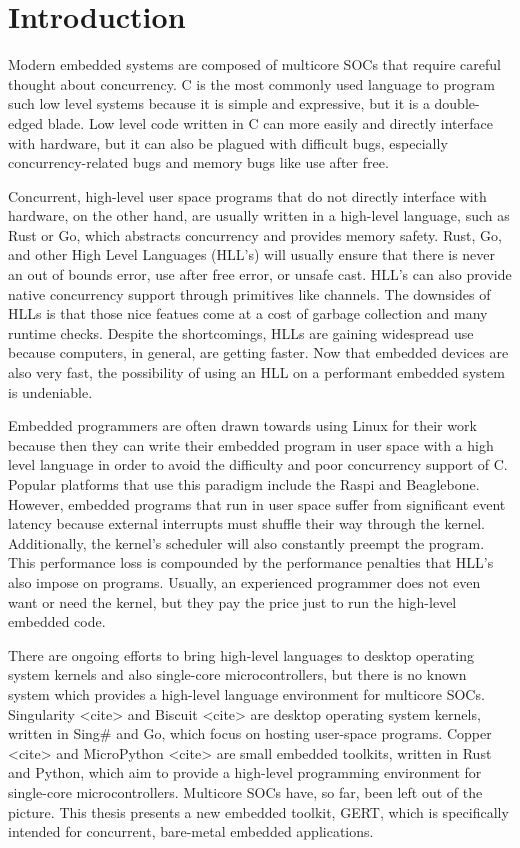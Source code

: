 \chapter{Introduction}

Modern embedded systems are composed of multicore SOCs that require
careful thought about concurrency. C is the
most commonly used language to program such low level systems because
it is simple and expressive, but it is
a double-edged blade. Low level code written in C can more easily and
directly interface with hardware, but it can also be plagued with
difficult bugs, especially concurrency-related bugs and memory bugs like
use after free.

Concurrent, high-level user space programs that do not directly interface with
hardware, on the other hand, are usually written in a
high-level language, such as Rust or Go, which abstracts concurrency
and provides memory safety. Rust, Go, and other High Level Languages (HLL's)
will usually ensure that there is never an out of bounds error, use
after free error, or unsafe cast. HLL's can also provide native concurrency
support through primitives like channels. The downsides of HLLs is that those
nice featues come at a cost of garbage collection and many runtime checks.
Despite the shortcomings, HLLs are gaining widespread use because computers,
in general, are getting faster. Now that embedded devices are also very fast,
the possibility of using an HLL on a performant embedded system is undeniable.

Embedded programmers are often drawn towards using Linux for their work
because then they can write their embedded program in user space with a
high level language in order to avoid the difficulty and poor concurrency
support of C. Popular platforms that use this paradigm include
the Raspi and Beaglebone. However, embedded programs that run in user space suffer
from significant event latency because external interrupts
must shuffle their way through the kernel. Additionally, the kernel's scheduler
will also constantly preempt the program. This performance loss is compounded by the
performance penalties that HLL's also impose on programs.
Usually, an experienced programmer does not even want or need the
kernel, but they pay the price just to run the high-level embedded code.

There are ongoing efforts to bring high-level languages to desktop
operating system kernels and also single-core microcontrollers, but
there is no known system which provides a high-level language environment for
multicore SOCs. Singularity <cite> and Biscuit <cite> are desktop
operating system kernels, written in Sing\# and Go, which focus on
hosting user-space programs. Copper <cite> and MicroPython <cite>
are small embedded toolkits, written in Rust and Python, which aim
to provide a high-level programming environment for single-core
microcontrollers. Multicore SOCs have, so far, been left out of the
picture. This thesis presents a new embedded toolkit, GERT, which
is specifically intended for concurrent, bare-metal embedded applications.

